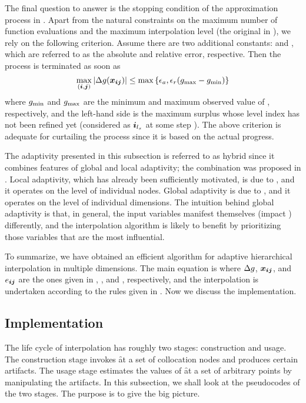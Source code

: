 The final question to answer is the stopping condition of the approximation
process in . Apart from the natural constraints on the
maximum number of function evaluations and the maximum interpolation level (the
original \ls in ), we rely on the following
criterion. Assume there are two additional constants:  and ,
which are referred to as the absolute and relative error, respective. Then the
process is terminated as soon as
\[
  \max_{(\boldsymbol{i}, \boldsymbol{j})} |\Delta g(\boldsymbol{x}_{\boldsymbol{i} \boldsymbol{j}})| \leq \max \left\{ \epsilon_{a}, \epsilon_{r} (g_{\mathrm{max}} - g_{\mathrm{min}}) \right\}
\]
where $g_{\mathrm{min}}$ and $g_{\mathrm{max}}$ are the minimum and maximum observed value
of \g, respectively, and the left-hand side is the maximum surplus whose level
index has not been refined yet (considered as $\boldsymbol{i}_{{l_{s}}}$ at some step \ls). The
above criterion is adequate for curtailing the process since it is based on the
actual progress.

The adaptivity presented in this subsection is referred to as hybrid since it
combines features of global and local adaptivity; the combination was proposed
in \cite{jakeman2012}. Local adaptivity, which has already been sufficiently
motivated, is due to \cite{ma2009}, and it operates on the level of individual
nodes. Global adaptivity is due to \cite{klimke2006}, and it operates on the
level of individual dimensions. The intuition behind global adaptivity is that,
in general, the input variables manifest themselves (impact \g) differently, and
the interpolation algorithm is likely to benefit by prioritizing those variables
that are the most influential.

To summarize, we have obtained an efficient algorithm for adaptive hierarchical
interpolation in multiple dimensions. The main equation is
 where $\Delta g$, $\boldsymbol{x}_{\boldsymbol{i} \boldsymbol{j}}$, and $e_{\boldsymbol{i} \boldsymbol{j}}$
are the ones given in , , and
, respectively, and the interpolation is undertaken
according to the rules given in . Now we discuss
the implementation.

\subsection{Implementation}

The life cycle of interpolation has roughly two stages: construction and usage.
The construction stage invokes \f at a set of collocation nodes and produces
certain artifacts. The usage stage estimates the values of \f at a set of
arbitrary points by manipulating the artifacts. In this subsection, we shall
look at the pseudocodes of the two stages. The purpose is to give the big
picture.

